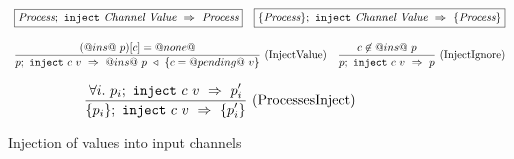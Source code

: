 
\begin{figure}

$$
\begin{array}{lr} 
  \boxed{\textit{Process};~\texttt{inject}~\textit{Channel}~\textit{Value}~\Rightarrow~\textit{Process}}
 & 
  \boxed{\{ \textit{Process} \};~\texttt{inject}~\textit{Channel}~\textit{Value}~\Rightarrow~\{ \textit{Process} \}}
 \end{array}
$$

$$
\ruleIN{
  (@ins@~ p)[c] = @none@
}{
  \ProcInject{p}{c}{v}{\HeapUpdateOne{c}{@pending@~v}{@ins@~p}}
}{InjectValue}
%
\ruleIN{
  c \not\in @ins@~p
}{
  \ProcInject{p}{c}{v}{p}
}{InjectIgnore}
$$

$$
\enskip \frac {\displaystyle 
  \forall i.~ p_i;~\texttt{inject}~c~v~\Rightarrow~p'_i
} {\displaystyle 
  \{ p_i \};~\texttt{inject}~c~v~\Rightarrow~\{ p'_i \}
} \  \mbox{(ProcessesInject)} \enskip
$$

\caption{Injection of values into input channels}
\label{fig:Process:Eval:Inject}
\end{figure}


